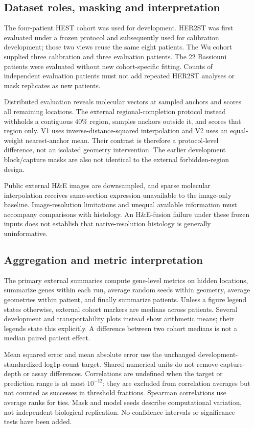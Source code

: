 \subsection{Dataset roles, masking and interpretation}
The four-patient HEST cohort was used for development. HER2ST was first evaluated under a frozen protocol and subsequently used for calibration development; those two views reuse the same eight patients. The Wu cohort supplied three calibration and three evaluation patients. The 22 Bassiouni patients were evaluated without new cohort-specific fitting. Counts of independent evaluation patients must not add repeated HER2ST analyses or mask replicates as new patients.

Distributed evaluation reveals molecular vectors at sampled anchors and scores all remaining locations. The external regional-completion protocol instead withholds a contiguous 40\% region, samples anchors outside it, and scores that region only. V1 uses inverse-distance-squared interpolation and V2 uses an equal-weight nearest-anchor mean. Their contrast is therefore a protocol-level difference, not an isolated geometry intervention. The earlier development block/capture masks are also not identical to the external forbidden-region design.

Public external H\&E images are downsampled, and sparse molecular interpolation receives same-section expression unavailable to the image-only baseline. Image-resolution limitations and unequal available information must accompany comparisons with histology. An H\&E-fusion failure under these frozen inputs does not establish that native-resolution histology is generally uninformative.

\subsection{Aggregation and metric interpretation}
The primary external summaries compute gene-level metrics on hidden locations, summarize genes within each run, average random seeds within geometry, average geometries within patient, and finally summarize patients. Unless a figure legend states otherwise, external cohort markers are medians across patients. Several development and transportability plots instead show arithmetic means; their legends state this explicitly. A difference between two cohort medians is not a median paired patient effect.

Mean squared error and mean absolute error use the unchanged development-standardized log1p-count target. Shared numerical units do not remove capture-depth or assay differences. Correlations are undefined when the target or prediction range is at most $10^{-12}$; they are excluded from correlation averages but not counted as successes in threshold fractions. Spearman correlations use average ranks for ties. Mask and model seeds describe computational variation, not independent biological replication. No confidence intervals or significance tests have been added.
\clearpage
